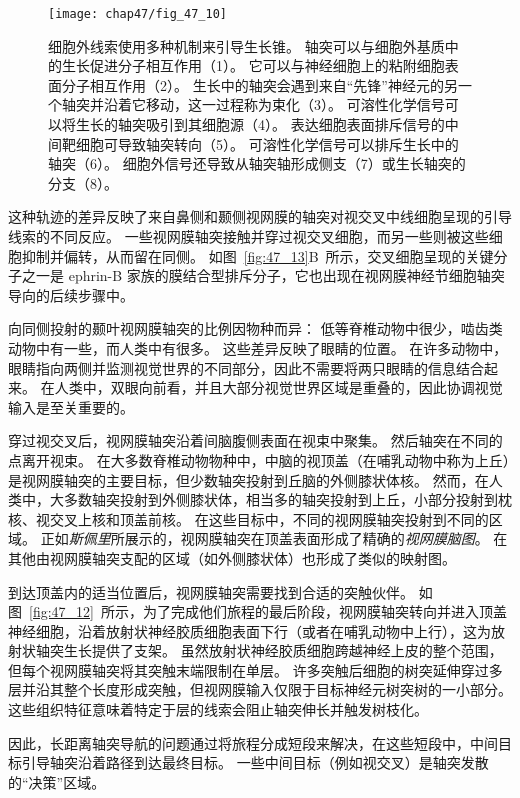 \begin{figure}[htbp]
	\centering
	\texttt{[image: chap47/fig\_47\_10]}
	\caption{细胞外线索使用多种机制来引导生长锥。
		轴突可以与细胞外基质中的生长促进分子相互作用（1）。
		它可以与神经细胞上的粘附细胞表面分子相互作用（2）。
		生长中的轴突会遇到来自“先锋”神经元的另一个轴突并沿着它移动，这一过程称为束化（3）。
		可溶性化学信号可以将生长的轴突吸引到其细胞源（4）。
		表达细胞表面排斥信号的中间靶细胞可导致轴突转向（5）。
		可溶性化学信号可以排斥生长中的轴突（6）。
		细胞外信号还导致从轴突轴形成侧支（7）或生长轴突的分支（8）。}
	\label{fig:47_10}
\end{figure}


这种轨迹的差异反映了来自鼻侧和颞侧视网膜的轴突对视交叉中线细胞呈现的引导线索的不同反应。
一些视网膜轴突接触并穿过视交叉细胞，而另一些则被这些细胞抑制并偏转，从而留在同侧。
如图~\ref{fig:47_13}B~所示，交叉细胞呈现的关键分子之一是 ephrin-B 家族的膜结合型排斥分子，它也出现在视网膜神经节细胞轴突导向的后续步骤中。


向同侧投射的颞叶视网膜轴突的比例因物种而异：
低等脊椎动物中很少，啮齿类动物中有一些，而人类中有很多。
这些差异反映了眼睛的位置。
在许多动物中，眼睛指向两侧并监测视觉世界的不同部分，因此不需要将两只眼睛的信息结合起来。
在人类中，双眼向前看，并且大部分视觉世界区域是重叠的，因此协调视觉输入是至关重要的。


穿过视交叉后，视网膜轴突沿着间脑腹侧表面在视束中聚集。
然后轴突在不同的点离开视束。
在大多数脊椎动物物种中，中脑的视顶盖（在哺乳动物中称为上丘）是视网膜轴突的主要目标，但少数轴突投射到丘脑的外侧膝状体核。
然而，在人类中，大多数轴突投射到外侧膝状体，相当多的轴突投射到上丘，小部分投射到枕核、视交叉上核和顶盖前核。
在这些目标中，不同的视网膜轴突投射到不同的区域。
正如\textit{斯佩里}所展示的，视网膜轴突在顶盖表面形成了精确的\textit{视网膜脑图}。
在其他由视网膜轴突支配的区域（如外侧膝状体）也形成了类似的映射图。


到达顶盖内的适当位置后，视网膜轴突需要找到合适的突触伙伴。
如图~\ref{fig:47_12}~所示，为了完成他们旅程的最后阶段，视网膜轴突转向并进入顶盖神经细胞，沿着放射状神经胶质细胞表面下行（或者在哺乳动物中上行），这为放射状轴突生长提供了支架。
虽然放射状神经胶质细胞跨越神经上皮的整个范围，但每个视网膜轴突将其突触末端限制在单层。
许多突触后细胞的树突延伸穿过多层并沿其整个长度形成突触，但视网膜输入仅限于目标神经元树突树的一小部分。
这些组织特征意味着特定于层的线索会阻止轴突伸长并触发树枝化。


因此，长距离轴突导航的问题通过将旅程分成短段来解决，在这些短段中，中间目标引导轴突沿着路径到达最终目标。
一些中间目标（例如视交叉）是轴突发散的“决策”区域。


